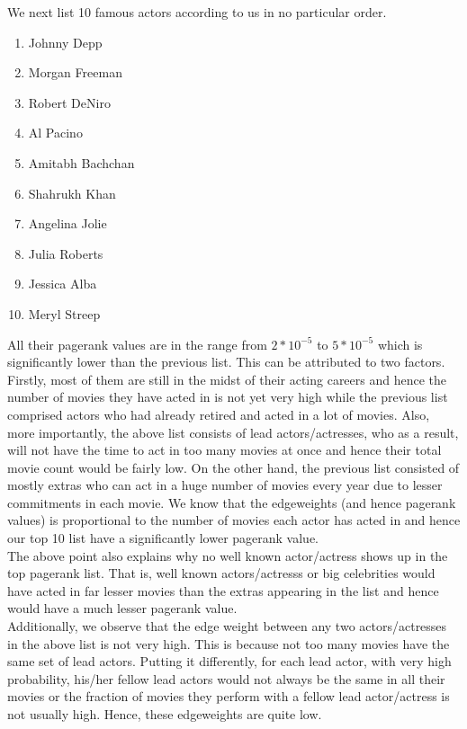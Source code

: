 \documentclass{article}
\begin{document}
We next list 10 famous actors according to us in no particular order.
\begin{enumerate}
 \item 
 Johnny Depp
 \item
 Morgan Freeman
 \item
 Robert DeNiro
 \item
 Al Pacino
 \item
 Amitabh Bachchan
 \item
 Shahrukh Khan
 \item
 Angelina Jolie
 \item
 Julia Roberts
 \item
 Jessica Alba
 \item
 Meryl Streep
 \end{enumerate}
All their pagerank values are in the range from $2*10^{-5}$ to $5*10^{-5}$ which is significantly lower than the previous list.
This can be attributed to two factors. Firstly, most of them are still in the midst of their acting careers and hence the number
of movies they have acted in is not yet very high while the previous list comprised actors who had already retired and 
acted in a lot of movies. Also, more importantly, the above list consists of lead actors/actresses, who as a result, will not have the time
to act in too many movies at once and hence their total movie count would be fairly low. On the other hand, the previous list
consisted of mostly extras who can act in a huge number of movies every year due to lesser commitments in each movie.
We know that the edgeweights (and hence pagerank values) is proportional to the number of movies each actor has acted
in and hence our top 10 list have a significantly lower pagerank value.\\

The above point also explains why no well known actor/actress shows up in the top pagerank list. That is, well known actors/actresss or 
big celebrities would have acted in far lesser movies than the extras appearing in the list and hence would have a much lesser
pagerank value.\\

Additionally, we observe that the edge weight between any two actors/actresses in the above list is not very high. This 
is because not too many movies have the same set of lead actors. Putting it differently, for each lead actor, with very
high probability, his/her fellow lead actors would not always be the same in all their movies or the fraction of movies
they perform with a fellow lead actor/actress is not usually high. Hence, these edgeweights are quite low.\\
 
\end{document}
